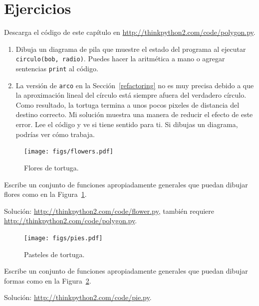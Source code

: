 \documentclass[10pt]{book}
\begin{document}
\section{Ejercicios}

\begin{exercise}

Descarga el código de este capítulo en
\url{http://thinkpython2.com/code/polygon.py}.

\begin{enumerate}

\item Dibuja un diagrama de pila que muestre el estado del programa
al ejecutar {\tt circulo(bob, radio)}.  Puedes hacer la
aritmética a mano o agregar sentencias {\tt print} al código.

\item La versión de {\tt arco} en la Sección~\ref{refactoring} no es
muy precisa debido a que la aproximación lineal del
círculo está siempre afuera del verdadero círculo.  Como resultado,
la tortuga termina a unos pocos pixeles de distancia del destino
correcto.  Mi solución muestra una manera de reducir
el efecto de este error.  Lee el código y ve si
tiene sentido para ti.  Si dibujas un diagrama, podrías ver cómo trabaja.

\end{enumerate}

\end{exercise}

\begin{figure}
\centerline
{\texttt{[image: figs/flowers.pdf]}}
\caption{Flores de tortuga.}
\label{fig.flowers}
\end{figure}

\begin{exercise}

Escribe un conjunto de funciones apropiadamente generales que
puedan dibujar flores como en la Figura~\ref{fig.flowers}.

Solución: \url{http://thinkpython2.com/code/flower.py},
también requiere \url{http://thinkpython2.com/code/polygon.py}.

\end{exercise}

\begin{figure}
\centerline
{\texttt{[image: figs/pies.pdf]}}
\caption{Pasteles de tortuga.}
\label{fig.pies}
\end{figure}


\begin{exercise}

Escribe un conjunto de funciones apropiadamente generales que
puedan dibujar formas como en la Figura~\ref{fig.pies}.

Solución: \url{http://thinkpython2.com/code/pie.py}.

\end{exercise}
\end{document}
